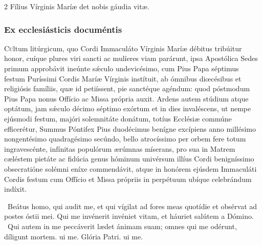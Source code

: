 \documentclass[9pt,twoside]{extarticle}
\begin{document}
\begin{multicols}{2}
\smallskip
{\small {} Fílius Vírginis Maríæ det nobis gáudia vitæ.}

\subsubsection*{\center \normalfont {} \hfill Ex ecclesiásticis documéntis}
\lettrine{C}ultum litúrgicum, quo Cordi Immaculáto Vírginis Maríæ débitus tribúitur honor, cuíque plures viri sancti ac mulíeres viam parárunt, ipsa Apostólica Sedes primum approbávit ineúnte sǽculo undevicésimo, cum Pius Papa séptimus festum Puríssimi Cordis Maríæ Vírginis instítuit, ab ómnibus diœcésibus et religiósis famíliis, quæ id petiíssent, pie sanctéque agéndum: quod póstmodum Pius Papa nonus Offício ac Missa própria auxit. Ardens autem stúdium atque optátum, jam sǽculo décimo séptimo exórtum et in dies invaléscens, ut nempe ejúsmodi festum, majóri solemnitáte donátum, totíus Ecclésiæ commúne efficerétur, Summus Póntifex Pius duodécimus benígne excípiens anno millésimo nongentésimo quadragésimo secúndo, bello atrocíssimo per orbem fere totum ingravescénte, infínitas populórum ærúmnas míserans, pro sua in Matrem cæléstem pietáte ac fidúcia genus hóminum univérsum illíus Cordi benigníssimo obsecratióne solémni eníxe commendávit, atque in honórem ejúsdem Immaculáti Cordis festum cum Offício et Missa própriis in perpétuum ubíque celebrándum indíxit.

\smallskip
{}~Beátus homo, qui audit me, et qui vígilat ad fores meas quotídie et obsérvat ad postes óstii mei. \textred{*} Qui me invénerit invéniet vitam, et háuriet salútem a Dómino. ~Qui autem in me peccáverit lædet ánimam suam; omnes qui me odérunt, díligunt mortem. ui me. Glória Patri. ui me.


\end{multicols}
\end{document}
